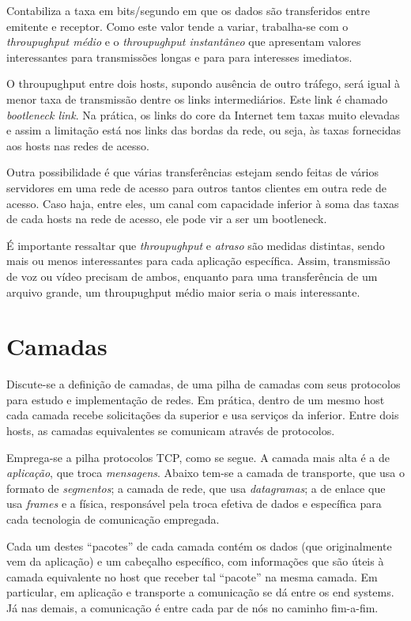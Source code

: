 Contabiliza a taxa em bits/segundo em que os dados são transferidos entre emitente e receptor.
Como este valor tende a variar, trabalha-se com o \emph{throupughput médio} e o \emph{throupughput instantâneo} que apresentam valores interessantes para transmissões longas e para para interesses imediatos.

O throupughput entre dois hosts, supondo ausência de outro tráfego, será igual à menor taxa de transmissão dentre os links intermediários.
Este link é chamado \emph{bootleneck link}.
Na prática, os links do core da Internet tem taxas muito elevadas e assim a limitação está nos links das bordas da rede, ou seja, às taxas fornecidas aos hosts nas redes de acesso.

Outra possibilidade é que várias transferências estejam sendo feitas de vários servidores em uma rede de acesso para outros tantos clientes em outra rede de acesso.
Caso haja, entre eles, um canal com capacidade inferior à soma das taxas de cada hosts na rede de acesso, ele pode vir a ser um bootleneck.

É importante ressaltar que \emph{throupughput} e \emph{atraso} são medidas distintas, sendo mais ou menos interessantes para cada aplicação específica.
Assim, transmissão de voz ou vídeo precisam de ambos, enquanto para uma transferência de um arquivo grande, um throupughput médio maior seria o mais interessante.

\section{Camadas}

Discute-se a definição de camadas, de uma pilha de camadas com seus protocolos para estudo e implementação de redes.
Em prática, dentro de um mesmo host cada camada recebe solicitações da superior e usa serviços da inferior.
Entre dois hosts, as camadas equivalentes se comunicam através de protocolos.

Emprega-se a pilha protocolos TCP, como se segue.
A camada mais alta é a de \emph{aplicação}, que troca \emph{mensagens}.
Abaixo tem-se a camada de transporte, que usa o formato de \emph{segmentos}; 
a camada de rede, que usa \emph{datagramas};
a de enlace que usa \emph{frames} e a física, responsável pela troca efetiva de dados e específica para cada tecnologia de comunicação empregada.

Cada um destes ``pacotes'' de cada camada contém os dados (que originalmente vem da aplicação) e um cabeçalho específico, 
com informações que são úteis à camada equivalente no host que receber tal ``pacote'' na mesma camada.
Em particular, em aplicação e transporte a comunicação se dá entre os end systems.
Já nas demais, a comunicação é entre cada par de nós no caminho fim-a-fim.

